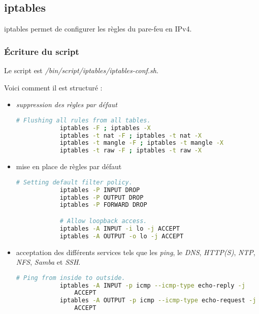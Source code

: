 \subsection{iptables}
\label{subsec:iptables}

iptables permet de configurer les règles du pare-feu en IPv4.

\subsubsection{Écriture du script}
\label{subsubsec:ecriture-script}

Le script est \textit{/bin/script/iptables/iptables-conf.sh}.

Voici comment il est structuré :
\begin{itemize}
    \item \textit{suppression des règles par défaut}

        \begin{lstlisting}[language=bash]
            # Flushing all rules from all tables.
            iptables -F ; iptables -X
            iptables -t nat -F ; iptables -t nat -X
            iptables -t mangle -F ; iptables -t mangle -X
            iptables -t raw -F ; iptables -t raw -X
        \end{lstlisting}

    \item mise en place de règles par défaut

        \begin{lstlisting}[language=bash]
            # Setting default filter policy.
            iptables -P INPUT DROP
            iptables -P OUTPUT DROP
            iptables -P FORWARD DROP

            # Allow loopback access.
            iptables -A INPUT -i lo -j ACCEPT
            iptables -A OUTPUT -o lo -j ACCEPT
        \end{lstlisting}

    \item acceptation des différents services tels que les \emph{ping}, le
    \emph{DNS}, \emph{HTTP(S)}, \emph{NTP}, \emph{NFS}, \emph{Samba} et \emph{SSH}.

        \begin{lstlisting}[language=bash]
            # Ping from inside to outside.
            iptables -A INPUT -p icmp --icmp-type echo-reply -j
                ACCEPT
            iptables -A OUTPUT -p icmp --icmp-type echo-request -j
                ACCEPT


\end{lstlisting}
\end{itemize}
